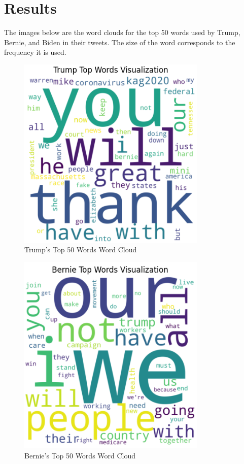 \documentclass{article}
\begin{document}
\section{Results}

The images below are the word clouds for the top 50 words used by Trump, Bernie, and Biden in their tweets. The size of the word corresponds to the frequency it is used.

    
\begin{figure}[H]
    \centering
    \includegraphics[width=9cm]{TrumpWordCloud50Crop.png}
    \caption{Trump's Top 50 Words Word Cloud}
    \label{fig:trump50}
\end{figure}

\begin{figure}[H]
    \centering
    \includegraphics[width=9cm]{BernieWordCloud50Crop.png}
    \caption{Bernie's Top 50 Words Word Cloud}
    \label{fig:bernie50}
\end{figure}
\end{document}
